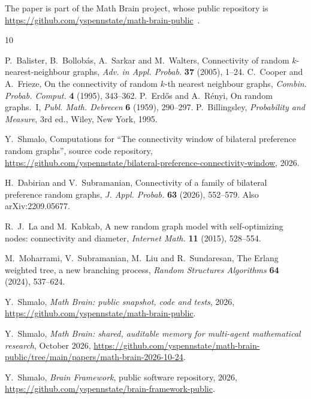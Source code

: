 \documentclass[11pt]{amsart}
\theoremstyle{remark}
\numberwithin{equation}{section}
\newcommand{\1}{\mathbf 1}
\begin{document}
The paper is part of the Math Brain project, whose public repository is \url{https://github.com/yspennstate/math-brain-public}~\cite{MathBrainRepo}.

\begin{thebibliography}{10}

P.~Balister, B.~Bollob\'as, A.~Sarkar and M.~Walters, Connectivity of random $k$-nearest-neighbour graphs, \emph{Adv. in Appl. Probab.} \textbf{37} (2005), 1--24.
C.~Cooper and A.~Frieze, On the connectivity of random $k$-th nearest neighbour graphs, \emph{Combin. Probab. Comput.} \textbf{4} (1995), 343--362.
P.~Erd\H{o}s and A.~R\'enyi, On random graphs.~I, \emph{Publ. Math. Debrecen} \textbf{6} (1959), 290--297.
P.~Billingsley, \emph{Probability and Measure}, 3rd ed., Wiley, New York, 1995.

Y.~Shmalo, Computations for ``The connectivity window of bilateral preference random graphs'', source code repository, \url{https://github.com/yspennstate/bilateral-preference-connectivity-window}, 2026.

H.~Dabirian and V.~Subramanian, Connectivity of a family of bilateral preference random graphs, \emph{J. Appl. Probab.} \textbf{63} (2026), 552--579. Also arXiv:2209.05677.

R.~J.~La and M.~Kabkab, A new random graph model with self-optimizing nodes: connectivity and diameter, \emph{Internet Math.} \textbf{11} (2015), 528--554.

M.~Moharrami, V.~Subramanian, M.~Liu and R.~Sundaresan, The Erlang weighted tree, a new branching process, \emph{Random Structures Algorithms} \textbf{64} (2024), 537--624.

 Y.~Shmalo, \emph{Math Brain: public snapshot, code and tests}, 2026, \url{https://github.com/yspennstate/math-brain-public}.

 Y.~Shmalo, \emph{Math Brain: shared, auditable memory for multi-agent mathematical research}, October 2026, \url{https://github.com/yspennstate/math-brain-public/tree/main/papers/math-brain-2026-10-24}.

 Y.~Shmalo, \emph{Brain Framework}, public software repository, 2026, \url{https://github.com/yspennstate/brain-framework-public}.

\end{thebibliography}
\end{document}
